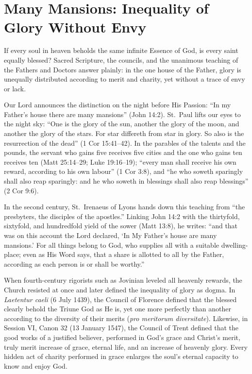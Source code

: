 \section{Many Mansions: Inequality of Glory Without Envy}

If every soul in heaven beholds the same infinite Essence of God, is every saint equally blessed? Sacred Scripture, the councils, and the unanimous teaching of the Fathers and Doctors answer plainly: in the one house of the Father, glory is unequally distributed according to merit and charity, yet without a trace of envy or lack.

Our Lord announces the distinction on the night before His Passion: ``In my Father's house there are many mansions'' (John 14:2). St.\ Paul lifts our eyes to the night sky: ``One is the glory of the sun, another the glory of the moon, and another the glory of the stars. For star differeth from star in glory. So also is the resurrection of the dead'' (1 Cor 15:41--42). In the parables of the talents and the pounds, the servant who gains five receives five cities and the one who gains ten receives ten (Matt 25:14--29; Luke 19:16--19); ``every man shall receive his own reward, according to his own labour'' (1 Cor 3:8), and ``he who soweth sparingly shall also reap sparingly: and he who soweth in blessings shall also reap blessings'' (2 Cor 9:6).

In the second century, St.\ Irenaeus of Lyons hands down this teaching from ``the presbyters, the disciples of the apostles.'' Linking John 14:2 with the thirtyfold, sixtyfold, and hundredfold yield of the sower (Matt 13:8), he writes: ``and that was on this account the Lord declared, `In My Father's house are many mansions.' For all things belong to God, who supplies all with a suitable dwelling-place; even as His Word says, that a share is allotted to all by the Father, according as each person is or shall be worthy.''

When fourth-century rigorists such as Jovinian leveled all heavenly rewards, the Church resisted at once and later defined the inequality of glory as dogma. In \textit{Laetentur caeli} (6 July 1439), the Council of Florence defined that the blessed clearly behold the Triune God as He is, yet one more perfectly than another according to the diversity of their merits (\textit{pro meritorum diversitate}). Likewise, in Session VI, Canon 32 (13 January 1547), the Council of Trent defined that the good works of a justified believer, performed in God's grace and Christ's merit, truly merit increase of grace, eternal life, and an increase of heavenly glory. Every hidden act of charity performed in grace enlarges the soul's eternal capacity to know and enjoy God.

